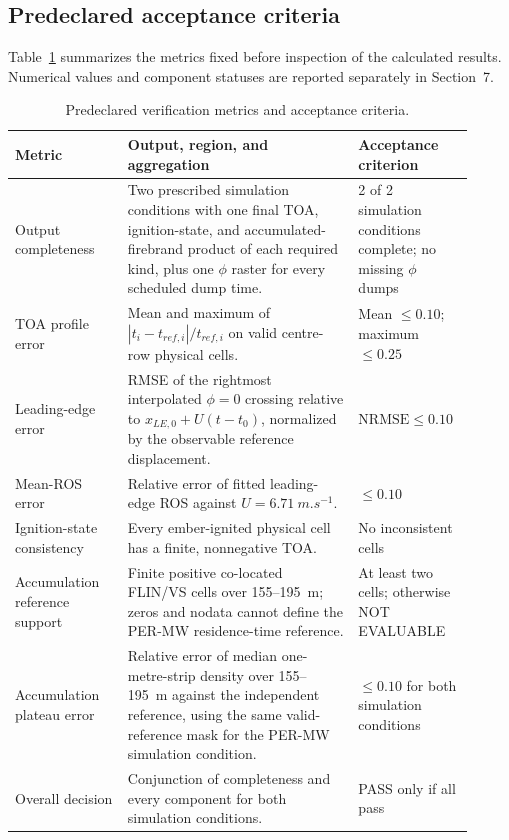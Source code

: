 \subsection{Predeclared acceptance criteria}

Table~\ref{tab:acceptance-contract} summarizes the metrics fixed before
inspection of the calculated results. Numerical values and component statuses
are reported separately in Section~7.

\begin{table}[H]
\centering
\footnotesize
\caption{Predeclared verification metrics and acceptance criteria.}
\label{tab:acceptance-contract}
\begin{tabular}{@{}p{0.23\linewidth}p{0.47\linewidth}p{0.21\linewidth}@{}}
\toprule
Metric & Output, region, and aggregation & Acceptance criterion\\
\midrule
Output completeness & Two prescribed simulation conditions with one final TOA, ignition-state, and accumulated-firebrand product of each required kind, plus one $\phi$ raster for every scheduled dump time. & 2 of 2 simulation conditions complete; no missing $\phi$ dumps \\
TOA profile error & Mean and maximum of \(|t_i-t_{ref,i}|/t_{ref,i}\) on valid centre-row physical cells. & Mean \(\le0.10\); maximum \(\le0.25\) \\
Leading-edge error & RMSE of the rightmost interpolated $\phi=0$ crossing relative to \(x_{LE,0}+U(t-t_0)\), normalized by the observable reference displacement. & \(\mathrm{NRMSE}\le0.10\) \\
Mean-ROS error & Relative error of fitted leading-edge ROS against \(U=\SI{6.71}{m.s^{-1}}\). & \(\le0.10\) \\
Ignition-state consistency & Every ember-ignited physical cell has a finite, nonnegative TOA. & No inconsistent cells \\
Accumulation reference support & Finite positive co-located FLIN/VS cells over 155--\SI{195}{m}; zeros and nodata cannot define the PER-MW residence-time reference. & At least two cells; otherwise NOT EVALUABLE \\
Accumulation plateau error & Relative error of median one-metre-strip density over 155--\SI{195}{m} against the independent reference, using the same valid-reference mask for the PER-MW simulation condition. & \(\le0.10\) for both simulation conditions \\
Overall decision & Conjunction of completeness and every component for both simulation conditions. & PASS only if all pass \\
\bottomrule
\end{tabular}
\end{table}


